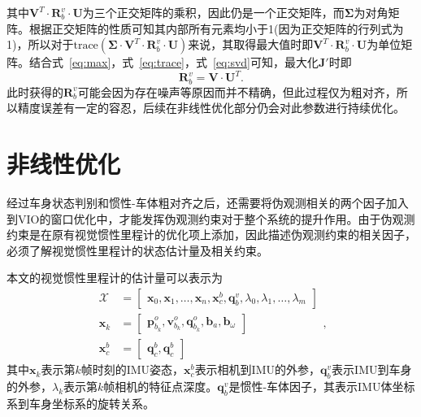 其中$\symbf{V}^T \cdot \symbf{R}_{b}^{v} \cdot \symbf{U}$为三个正交矩阵的乘积，因此仍是一个正交矩阵，而$\symbf{\Sigma}$为对角矩阵。根据正交矩阵的性质可知其内部所有元素均小于1(因为正交矩阵的行列式为1)，所以对于$\text{trace}(\symbf{\Sigma} \cdot \symbf{V}^T \cdot \symbf{R}_{b}^{v} \cdot \symbf{U})$来说，其取得最大值时即$\symbf{V}^T \cdot \symbf{R}_{b}^{v} \cdot \symbf{U}$为单位矩阵。结合式~\ref{eq:max}，式~\ref{eq:trace}，式~\ref{eq:svd}可知，最大化$\symbf{J}'$时即
\begin{equation}
  \symbf{R}_{b}^{v} = \symbf{V} \cdot \symbf{U}^T.
\end{equation}
此时获得的$\symbf{R}_{b}^{v}$可能会因为存在噪声等原因而并不精确，但此过程仅为粗对齐，所以精度误差有一定的容忍，后续在非线性优化部分仍会对此参数进行持续优化。

\section{非线性优化}
经过车身状态判别和惯性-车体粗对齐之后，还需要将伪观测相关的两个因子加入到VIO的窗口优化中，才能发挥伪观测约束对于整个系统的提升作用。由于伪观测约束是在原有视觉惯性里程计的优化项上添加，因此描述伪观测约束的相关因子，必须了解视觉惯性里程计的状态估计量及相关约束。

本文的视觉惯性里程计的估计量可以表示为
\begin{equation}
\begin{aligned}
  \mathcal{X} &= \begin{bmatrix} \symbf{x}_0, \symbf{x}_1, \dots, \symbf{x}_n, \symbf{x}_c^b, \symbf{q}_b^v, \lambda_0, \lambda_1, \dots, \lambda_m \end{bmatrix} \\
  \symbf{x}_k &= \begin{bmatrix} \symbf{p}_{b_{k}}^o, \symbf{v}_{b_{k}}^o, \symbf{q}_{b_{k}}^o, \symbf{b}_a, \symbf{b}_{\omega} \end{bmatrix} \\
  \symbf{x}_c^b &= \begin{bmatrix} \symbf{q}_{c}^b, \symbf{q}_{c}^b \end{bmatrix}
\end{aligned},
\end{equation}
其中$\symbf{x}_k$表示第$k$帧时刻的IMU姿态，$\symbf{x}_c^b$表示相机到IMU的外参，$\symbf{q}_b^v$表示IMU到车身的外参，$\lambda_k$表示第$k$帧相机的特征点深度。$\symbf{q}_b^v$是惯性-车体因子，其表示IMU体坐标系到车身坐标系的旋转关系。

